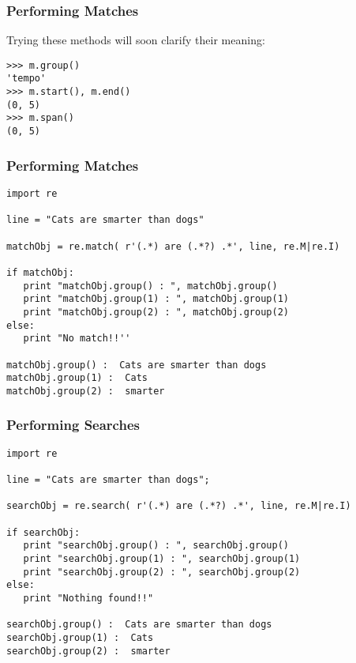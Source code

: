  \begin{frame}[fragile]
\frametitle{Performing Matches } 
Trying these methods will soon clarify their meaning:
\begin{lstlisting}
>>> m.group()
'tempo'
>>> m.start(), m.end()
(0, 5)
>>> m.span()
(0, 5)
\end{lstlisting}

\end{frame}

 \begin{frame}[fragile]
\frametitle{Performing Matches } 
\begin{lstlisting}
import re

line = "Cats are smarter than dogs"

matchObj = re.match( r'(.*) are (.*?) .*', line, re.M|re.I)

if matchObj:
   print "matchObj.group() : ", matchObj.group()
   print "matchObj.group(1) : ", matchObj.group(1)
   print "matchObj.group(2) : ", matchObj.group(2)
else:
   print "No match!!''
   
matchObj.group() :  Cats are smarter than dogs
matchObj.group(1) :  Cats
matchObj.group(2) :  smarter   
\end{lstlisting}

\end{frame}

 \begin{frame}[fragile]
\frametitle{Performing Searches } 
\begin{lstlisting}
import re

line = "Cats are smarter than dogs";

searchObj = re.search( r'(.*) are (.*?) .*', line, re.M|re.I)

if searchObj:
   print "searchObj.group() : ", searchObj.group()
   print "searchObj.group(1) : ", searchObj.group(1)
   print "searchObj.group(2) : ", searchObj.group(2)
else:
   print "Nothing found!!"
   
searchObj.group() :  Cats are smarter than dogs
searchObj.group(1) :  Cats
searchObj.group(2) :  smarter
\end{lstlisting}

\end{frame}

